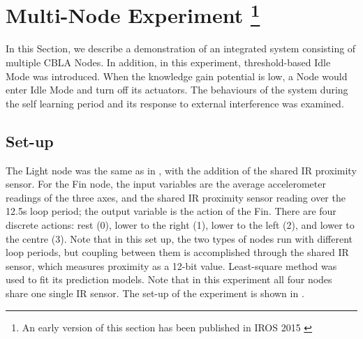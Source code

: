 \FloatBarrier

\section[Multi-Node Experiment]
{Multi-Node Experiment
	\footnote{An early version of this section has been published in IROS 2015 \cite{Chan2015} }}\label{sec:multi-node}


In this Section, we describe a demonstration of an integrated system consisting of multiple CBLA Nodes. In addition, in this experiment, threshold-based Idle Mode was introduced. When the knowledge gain potential is low, a Node would enter Idle Mode and turn off its actuators. The behaviours of the system during the self learning period and its response to external interference was examined.

\subsection{Set-up}
The Light node was the same as in , with the addition of the shared IR proximity sensor. For the Fin node, the input variables are the average accelerometer readings of the three axes, and the shared IR proximity sensor reading over the 12.5s loop period; the output variable is the action of the Fin. There are four discrete actions: rest (0), lower to the right (1), lower to the left (2), and lower to the centre (3). Note that in this set up, the two types of nodes run with different loop periods, but coupling between them is accomplished through the shared IR sensor, which measures proximity as a 12-bit value. Least-square method was used to fit its prediction models. Note that in this experiment all four nodes share one single IR sensor. The set-up of the experiment is shown in .

